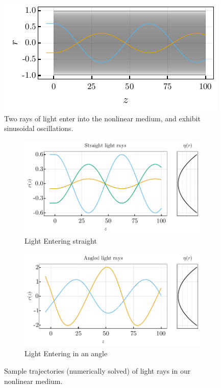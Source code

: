 \documentclass[%
 amsmath,amssymb,
aps,
 fleqn,
 notitlepage,
]{revtex4-2}
\begin{document}
\begin{figure}
    \includegraphics{rays.pdf}
    \caption{Two rays of light enter into the nonlinear medium, and exhibit sinusoidal oscillations.}
    \label{fig: rays}
\end{figure}

\begin{figure}
    \begin{subfigure}{.5\textwidth}
      \includegraphics[width=.9\linewidth]{ray_sim.pdf}
      \caption{Light Entering straight}
    \end{subfigure}%
    \begin{subfigure}{.5\textwidth}
      \includegraphics[width=.9\linewidth]{ray_sim_angled.pdf}
      \caption{Light Entering in an angle}
    \end{subfigure}
    \caption{Sample trajectories (numerically solved) of light rays in our nonlinear medium.}
    \label{fig: comp}
\end{figure}
\end{document}
